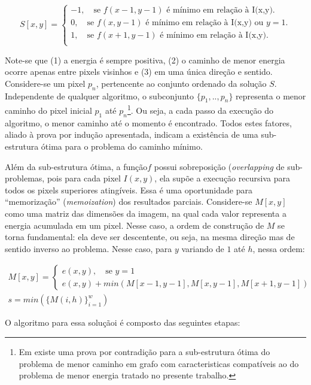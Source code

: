 \[ S[x,y] = \left\{ 
  \begin{array}{l}
    -1, \quad \text{se $f(x-1, y-1)$ é mínimo em relação à I(x,y).}\\
     0, \quad \text{se $f(x, y-1)$ é mínimo em relação à I(x,y) ou $y = 1$.}\\
     1, \quad \text{se $f(x+1, y-1)$ é mínimo em relação à I(x,y).}\\
  \end{array} \right.\]
\label{general-S}

Note-se que 
(1) a energia é sempre positiva, 
(2) o caminho de menor energia ocorre apenas entre pixels visinhos e 
(3) em uma única direção e sentido.
Considere-se um pixel $p_n$, 
pertencente ao conjunto ordenado da solução $S$.
Independente de qualquer algoritmo,
o subconjunto $\{p_1,..,p_n\}$ representa 
o menor caminho do pixel inicial $p_1$ até $p_n$\footnote{
Em \cite[pg. 383]{clrs} existe uma prova por contradição para 
a sub-estrutura ótima do problema de menor caminho
em grafo com caracteristicas compatíveis 
ao do problema de menor energia tratado no presente trabalho.
}. 
Ou seja, a cada passo da execução do algoritmo, 
o menor caminho até o momento é encontrado.
Todos estes fatores, aliado à prova por indução apresentada,
indicam a existência de uma sub-estrutura ótima 
para o problema do caminho mínimo.

Além da sub-estrutura ótima, 
a função$f$ possui sobreposição ({\it overlapping} de sub-problemas,
pois para cada pixel $I(x,y)$, ela supõe a execução recursiva para 
todos os pixels superiores atingíveis.
Essa é uma oportunidade para ``memorização'' ({\it memoization})
dos resultados parciais. 
Considere-se $M[x,y]$ como uma matriz das dimensões da imagem,
na qual cada valor representa a energia acumulada em um pixel.
Nesse caso, a ordem de construção de $M$ 
se torna fundamental: ela deve ser descentente, ou seja,
na mesma direção mas de sentido inverso ao problema.
Nesse caso, para $y$ variando de $1$ até $h$, nessa ordem:

\begin{gather}
M[x,y]=\left\{ 
  \begin{array}{l}
    e(x,y),\quad \text{se $y = 1$}\\
    e(x,y)+min(M[x-1,y-1],M[x,y-1],M[x+1,y-1])
  \end{array} \right. \nonumber\\
s = min(\{M(i,h)\}_{i=1}^w)
\label{general-M}
\end{gather}

O algoritmo para essa soluçãoi é composto das seguintes etapas:

